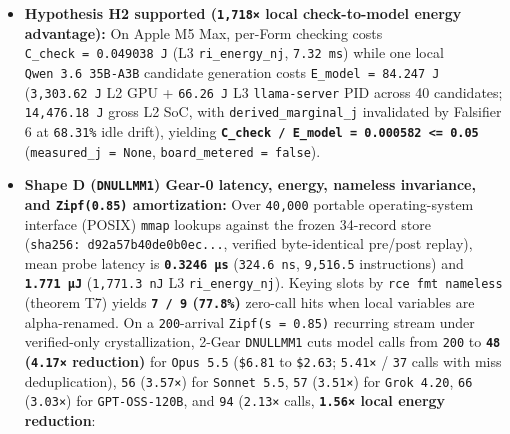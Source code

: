 \documentclass[10pt,letterpaper]{article}
\providecommand{\tightlist}{\setlength{\itemsep}{1pt}\setlength{\parskip}{0pt}}
\begin{document}
\begin{itemize}
\tightlist
\item
  \textbf{Hypothesis H2 supported (\texttt{1,718×} local check-to-model
  energy advantage):} On Apple M5 Max, per-Form checking costs
  \texttt{C\_\allowbreak{}check\ =\ 0.\allowbreak{}049038\ J} (L3 \texttt{ri\_\allowbreak{}energy\_\allowbreak{}nj},
  \texttt{7.32\ ms}) while one local \texttt{Qwen\ 3.\allowbreak{}6\ 35B-\allowbreak{}A3B}
  candidate generation costs \texttt{E\_\allowbreak{}model\ =\ 84.\allowbreak{}247\ J}
  (\texttt{3,\allowbreak{}303.\allowbreak{}62\ J} L2 GPU + \texttt{66.26\ J} L3
  \texttt{llama-\allowbreak{}server} PID across 40 candidates; \texttt{14,\allowbreak{}476.\allowbreak{}18\ J}
  gross L2 SoC, with \texttt{derived\_\allowbreak{}marginal\_\allowbreak{}j} invalidated by
  Falsifier 6 at \texttt{68.31\%} idle drift), yielding
  \textbf{\texttt{C\_check\ /\ E\_model\ =\ 0.000582\ \textless{}=\ 0.05}}
  (\texttt{measured\_\allowbreak{}j\ =\ None}, \texttt{board\_\allowbreak{}metered\ =\ false}).
\item
  \textbf{Shape D (\texttt{DNULLMM1}) Gear-0 latency, energy, nameless
  invariance, and \texttt{Zipf(\allowbreak{}0.\allowbreak{}85)} amortization:} Over
  \texttt{40,000} portable operating-system interface (POSIX)
  \texttt{mmap} lookups against the frozen 34-record store
  (\texttt{sha256:\ d92a57b4\allowbreak{}0de0b0ec.\allowbreak{}.\allowbreak{}.\allowbreak{}}, verified byte-identical
  pre/post replay), mean probe latency is \textbf{\texttt{0.\allowbreak{}3246\ µs}}
  (\texttt{324.6\ ns}, \texttt{9,516.5} instructions) and
  \textbf{\texttt{1.771\ µJ}} (\texttt{1,\allowbreak{}771.\allowbreak{}3\ nJ} L3
  \texttt{ri\_\allowbreak{}energy\_\allowbreak{}nj}). Keying slots by \texttt{rce\ fmt\ nameless}
  (theorem T7) yields \textbf{\texttt{7\ /\ 9} (\texttt{77.8\%})}
  zero-call hits when local variables are alpha-renamed. On a
  \texttt{200}-arrival \texttt{Zipf(\allowbreak{}s\ =\ 0.\allowbreak{}85)} recurring stream under
  verified-only crystallization, 2-Gear \texttt{DNULLMM1} cuts model
  calls from \texttt{200} to \textbf{\texttt{48} (\texttt{4.17×}
  reduction)} for \texttt{Opus\ 5.5} (\texttt{\$6.81} to
  \texttt{\$2.63}; \texttt{5.41×} / \texttt{37} calls with miss
  deduplication), \texttt{56} (\texttt{3.57×}) for \texttt{Sonnet\ 5.\allowbreak{}5},
  \texttt{57} (\texttt{3.51×}) for \texttt{Grok\ 4.\allowbreak{}20}, \texttt{66}
  (\texttt{3.03×}) for \texttt{GPT-\allowbreak{}OSS-\allowbreak{}120B}, and \texttt{94}
  (\texttt{2.13×} calls, \textbf{\texttt{1.56×} local energy reduction}:

\end{itemize}
\end{document}
